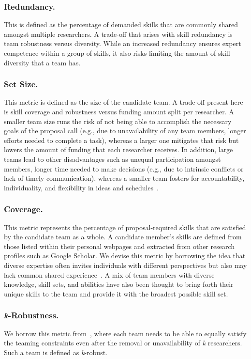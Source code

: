 \subsubsection{Redundancy.} This is defined as the percentage of demanded skills that are commonly shared amongst multiple researchers. A trade-off that arises with skill redundancy is team robustness versus diversity. While an increased redundancy ensures expert competence within a group of skills, it also risks limiting the amount of skill diversity that a team has.

\subsubsection{Set Size.} This metric is defined as the size of the candidate team. A trade-off present here is skill coverage and robustness versus funding amount split per researcher. A smaller team size runs the risk of not being able to accomplish the necessary goals of the proposal call (e.g., due to unavailability of any team members, longer efforts needed to complete a task), whereas a larger one mitigates that risk but lowers the amount of funding that each researcher receives. In addition, large teams lead to other disadvantages such as unequal participation amongst members, longer time needed to make decisions (e.g., due to intrinsic conflicts or lack of timely communication), whereas a smaller team fosters for accountability, individuality, and flexibility in ideas and schedules~\cite{mcleod1996ethnic}.

\subsubsection{Coverage.} This metric represents the percentage of proposal-required skills that are satisfied by the candidate team as a whole. A candidate member's skills are defined from those listed within their personal webpages and extracted from other research profiles such as Google Scholar. We devise this metric by borrowing the idea that diverse expertise often invites individuals with different perspectives but also may lack common shared experience~\cite{he2022expertise}. A mix of team members with diverse knowledge, skill sets, and abilities have also been thought to bring forth their unique skills to the team and provide it with the broadest possible skill set. %

\subsubsection{\textit{k}-Robustness.} We borrow this metric from~\cite{okimoto2015form}, where each team needs to be able to equally satisfy the teaming constraints even after the removal or unavailability of \textit{k} researchers. Such a team is defined as \textit{k}-robust. 

